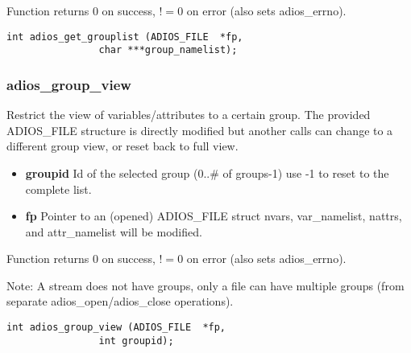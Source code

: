 Function returns 0 on success, $!=0$ on error (also sets adios\_errno).

\begin{lstlisting}[language=ADIOS]
int adios_get_grouplist (ADIOS_FILE  *fp, 
				char ***group_namelist);
\end{lstlisting}

\subsubsection*{adios\_group\_view}
Restrict the view of variables/attributes to a certain group.
The provided ADIOS\_FILE structure is directly modified but
another calls can change to a different group view, or reset
back to full view.

\begin{itemize}
\item{\bf groupid} Id of the selected group (0..\# of groups-1) use -1 to reset to the complete list.
\item{\bf fp} Pointer to an (opened) ADIOS\_FILE struct nvars, var\_namelist, nattrs, and attr\_namelist will be modified.
\end{itemize}

Function returns 0 on success, $!=0$ on error (also sets adios\_errno).

Note: A stream does not have groups, only a file can have multiple groups 
(from separate adios\_open/adios\_close operations). 

\begin{lstlisting}[language=ADIOS]
int adios_group_view (ADIOS_FILE  *fp, 
				int groupid);
\end{lstlisting}





